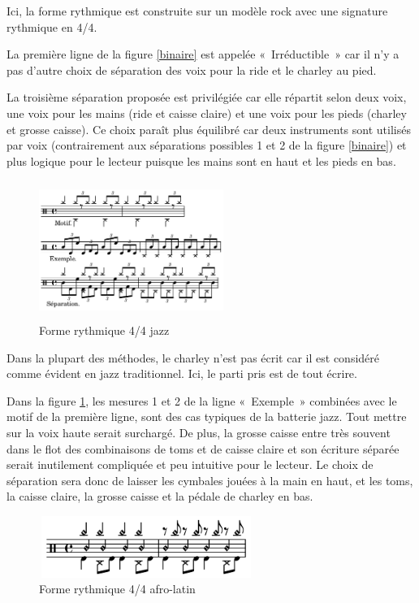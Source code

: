 Ici, la forme rythmique est construite sur un modèle rock avec une
signature rythmique en 4/4.

La première ligne de la figure \ref{binaire} est
appelée «~Irréductible~» car il n’y a pas d’autre choix de séparation des voix
pour la ride et le charley au pied.

La troisième séparation proposée est privilégiée car elle répartit selon deux 
voix, une voix pour les mains (ride et caisse claire) et une voix pour les
pieds (charley et grosse caisse). Ce choix paraît plus équilibré car deux
instruments sont utilisés par voix (contrairement aux séparations possibles 1 et 2
de la figure \ref{binaire}) et plus logique pour le lecteur puisque les mains
sont en haut et les pieds en bas.

\begin{figure}[h]
\centering
\includegraphics[height=45mm, width=60mm]{
z_images/3_methodes/2_systemes/2_separation_4-4_jazz.png}
\caption{Forme rythmique 4/4 jazz}
\label{jazz}
\end{figure}
\newpage
Dans la plupart des méthodes, le charley n’est pas écrit car il est considéré
comme évident en jazz traditionnel. Ici, le parti pris est de tout écrire.

Dans la figure \ref{jazz}, les mesures 1 et 2 de la ligne «~Exemple~» combinées
avec le motif de la première ligne, sont des cas typiques de la
batterie jazz. Tout mettre sur la voix haute serait surchargé. De plus, la
grosse caisse entre très souvent dans le flot des combinaisons de toms et de
caisse claire et son écriture séparée serait inutilement compliquée et peu
intuitive pour le lecteur. Le choix de séparation sera donc de laisser les
cymbales jouées à la main en haut, et les toms, la caisse claire, la grosse
caisse et la pédale de charley en bas.

\begin{figure}[h]
	\centering
	\includegraphics[height=20mm, width=70mm]{
    z_images/3_methodes/2_systemes/3_separation_afro-latins.png}
	\caption{Forme rythmique 4/4 afro-latin}
	\label{afro_latin}
\end{figure}

